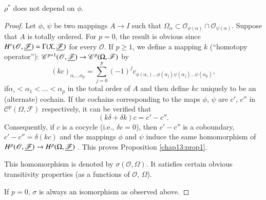 \setcounter{proposition}{0}
\begin{proposition}\label{chap13:prop1}
$\rho^\ast$ does not depend on $\phi$.
\end{proposition}

\begin{proof}
Let $\phi$, $\psi$ be two mappings $A \to I$ such that $\Omega_\alpha
\subset \mathscr{O}_{\phi (\alpha)} \cap
\mathscr{O}_{\psi(\alpha)}$. Suppose that $A$ is totally ordered. For
$p=0$, the result is obvious since $H^\circ (\mathscr{O},
\underline{\mathscr{F}}) = \Gamma (X, \underline{\mathscr{F}})$ for every
$\mathscr{O}$. If $p \geq 1$, we define a mapping $k$ (``homotopy
operator''): $\mathscr{C}^{p+1} (\mathscr{O}, \underline{\mathscr{F}}) \to
\mathscr{C}^p (\Omega, \mathscr{F})$ by 
$$
(kc)_{\alpha_\circ \ldots \alpha_p} = \sum\limits^p_{j=0 } (-1)^j
c_{\phi(\alpha_\circ) \ldots \phi(\alpha_j) \psi (\alpha_j) \ldots
  \psi (\alpha_p)}, 
$$
if\pageoriginale $\alpha_\circ < \alpha_1 < \ldots < \alpha_p$ in the
total order of $A$ and then define $kc$ uniquely to be an (alternate)
cochain. If the cochains corresponding to the maps $\phi$, $\psi$ are
$c'$, $c''$ in $\mathscr{C}^p (\Omega, \mathscr{F})$ respectively, it
can be verified that 
$$
(k \delta + \delta k) c = c' - c''.
$$
Consequently, if $c$ is a cocycle (i.e., $\delta c = 0$), then $c' -
c''$ is a coboundary, $c' - c'' = \delta (kc)$ and the mappings $\phi$
and $\psi$ induce the same homomorphism of $H^p (\mathscr{O},
\underline{\mathscr{F}}) \to H^p (\Omega, \underline{\mathscr{F}})$ . This proves
Proposition \ref{chap13:prop1}. 

This homomorphism is denoted by $\sigma (\mathscr{O}, \Omega)$. It
satisfies certain obvious transitivity properties (as a functions of
$\mathscr{O}$, $\Omega$).

If $p=0$, $\sigma$ is always an isomorphism as observed above.
\end{proof}

